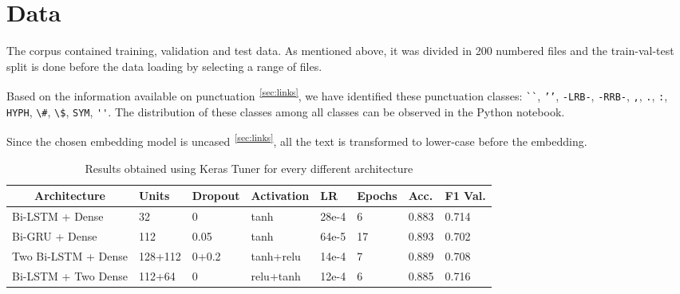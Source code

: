 \documentclass[11pt]{article}
\begin{document}
\section{Data}
\label{sec:data}


The corpus contained training, validation and test data.
As mentioned above, it was divided in 200 numbered files and the train-val-test split is done before the data loading by selecting a range of files.

Based on the information available on punctuation\textsuperscript{~\ref{sec:links}}, we have identified these punctuation classes: \verb|``|,  \verb|’’|,  \verb|-LRB-|,  \verb|-RRB-|, 
 \verb|,|,  \verb|.|,  \verb|:|,  \verb|HYPH|,  \verb|\#|,  \verb|\$|, 
 \verb|SYM|,  \verb|''|.
The distribution of these classes among all classes can be observed in the Python notebook.

Since the chosen embedding model is uncased\textsuperscript{~\ref{sec:links}}, all the text is transformed to lower-case before the embedding.

\begin{table*}[!t]
\begin{tabular}{l|l|l|l|l|l|l|l}
\multicolumn{1}{c|}{\textbf{Architecture}} & \textbf{Units} & \textbf{Dropout} & \textbf{Activation} & \textbf{LR} & \textbf{Epochs} & \textbf{Acc.} & \multicolumn{1}{c}{\textbf{F1 Val.}} \\ \hline
Bi-LSTM + Dense		& 32		& 0		& tanh		& 28e-4	& 6 	& 0.883	& 0.714	\\
Bi-GRU + Dense		& 112		& 0.05	& tanh		& 64e-5	& 17	& 0.893	& 0.702	\\
Two Bi-LSTM + Dense	& 128+112	& 0+0.2	& tanh+relu	& 14e-4	& 7		& 0.889	& 0.708	\\
Bi-LSTM + Two Dense	& 112+64    & 0		& relu+tanh	& 12e-4	& 6		& 0.885	& 0.716
\end{tabular}
\caption{Results obtained using Keras Tuner for every different architecture}
\label{table:tuner}
\end{table*}
\end{document}
